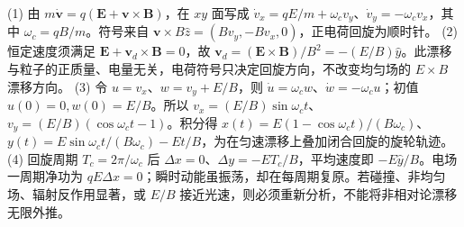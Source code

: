 (1) 由 \(m\dot{\boldsymbol v}=q(\boldsymbol E+\boldsymbol v\times\boldsymbol B)\)，在 \(xy\) 面写成 \(\dot v_x=qE/m+\omega_c v_y\)、\(\dot v_y=-\omega_c v_x\)，其中 \(\omega_c=qB/m\)。符号来自 \(\boldsymbol v\times B\hat z=(Bv_y,-Bv_x,0)\)，正电荷回旋为顺时针。
(2) 恒定速度须满足 \(\boldsymbol E+\boldsymbol v_d\times\boldsymbol B=0\)，故 \(\boldsymbol v_d=(\boldsymbol E\times\boldsymbol B)/B^2=-(E/B)\hat y\)。此漂移与粒子的正质量、电量无关，电荷符号只决定回旋方向，不改变均匀场的 \(E\times B\) 漂移方向。
(3) 令 \(u=v_x\)、\(w=v_y+E/B\)，则 \(\dot u=\omega_cw\)、\(\dot w=-\omega_cu\)；初值 \(u(0)=0,w(0)=E/B\)。所以 \(v_x=(E/B)\sin\omega_ct\)、\(v_y=(E/B)(\cos\omega_ct-1)\)。积分得 \(x(t)=E(1-\cos\omega_ct)/(B\omega_c)\)、\(y(t)=E\sin\omega_ct/(B\omega_c)-Et/B\)，为在匀速漂移上叠加闭合回旋的旋轮轨迹。
(4) 回旋周期 \(T_c=2\pi/\omega_c\) 后 \(\Delta x=0\)、\(\Delta y=-ET_c/B\)，平均速度即 \(-E\hat y/B\)。电场一周期净功为 \(qE\Delta x=0\)；瞬时动能虽振荡，却在每周期复原。若碰撞、非均匀场、辐射反作用显著，或 \(E/B\) 接近光速，则必须重新分析，不能将非相对论漂移无限外推。
